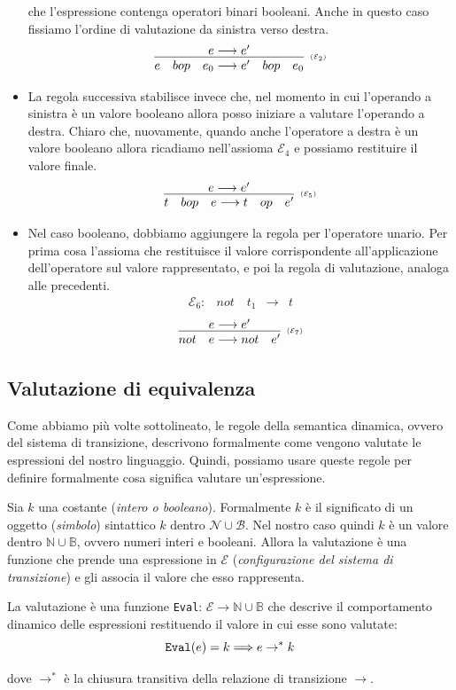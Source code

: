 \documentclass[oneside,a4paper,11pt]{book}
\theoremstyle{italicstyle}
\theoremstyle{normStyle}
\begin{document}
\begin{itemize}
che l’espressione contenga operatori binari booleani. Anche in questo
caso fissiamo l’ordine di valutazione da sinistra verso destra.
\[
  \infer[\scriptscriptstyle (\mathcal{E}_2)]
  {
    e \quad bop \quad e_0 \longrightarrow e' \quad bop \quad e_0
  }
  {
    e \longrightarrow e'
  }
  \]
  \item La regola successiva stabilisce invece che, nel momento in
  cui l’operando a sinistra è un valore booleano allora posso iniziare
  a valutare l’operando a destra. Chiaro che, nuovamente, quando anche
  l’operatore a destra è un valore booleano allora ricadiamo
  nell’assioma $\mathcal{E}_4$ e possiamo restituire il valore finale.
  \[
  \infer[\scriptscriptstyle (\mathcal{E}_5)]
  {
    t \quad bop \quad e \longrightarrow t \quad op \quad e'
  }
  {
    e \longrightarrow e'
  }
  \]
  \item Nel caso booleano, dobbiamo aggiungere la regola per
  l’operatore unario. Per prima cosa l’assioma che restituisce 
  il valore corrispondente all’applicazione dell’operatore sul
  valore rappresentato, e poi la regola di valutazione, analoga
  alle precedenti.
  \[
    \begin{matrix}
      \mathcal{E}_6: &not \quad t_1 & \longrightarrow & t
    \end{matrix}
  \]
  \[
    \infer[\scriptscriptstyle (\mathcal{E}_7)]
    {
      not \quad e \longrightarrow not \quad e'
    }
    {
      e \longrightarrow e'
    }
    \]
\end{itemize}
\subsection{Valutazione di equivalenza}
Come abbiamo più volte sottolineato, le regole della semantica dinamica, ovvero 
del sistema di transizione, descrivono formalmente come vengono valutate le 
espressioni del nostro linguaggio. Quindi, possiamo usare queste regole per definire 
formalmente cosa significa valutare un'espressione.

Sia $k$ una costante (\textit{intero o booleano}). Formalmente $k$ è il significato 
di un oggetto (\textit{simbolo}) sintattico $k$ dentro $\mathcal{N}\cup\mathcal{B}$.
Nel nostro caso quindi $k$ è un valore dentro $\mathbb{N}\cup\mathbb{B}$, ovvero numeri 
interi e booleani. Allora la valutazione è una funzione che prende una espressione 
in $\mathcal{E}$ (\textit{configurazione del sistema di transizione}) e gli associa 
il valore che esso rappresenta.
\begin{tcolorbox}[title ={Valutare delle espressioni}]
  La valutazione è una funzione \verb|Eval|: $\mathcal{E} \rightarrow \mathbb{N}\cup\mathbb{B}$
  che descrive il comportamento dinamico delle espressioni restituendo il valore in cui esse 
  sono valutate:
  \[
    \verb|Eval|(e)=k \Longrightarrow e \rightarrow^* k
  \]
\end{tcolorbox}
dove $\rightarrow^*$ è la chiusura transitiva della relazione di transizione $\rightarrow$.
\end{document}
